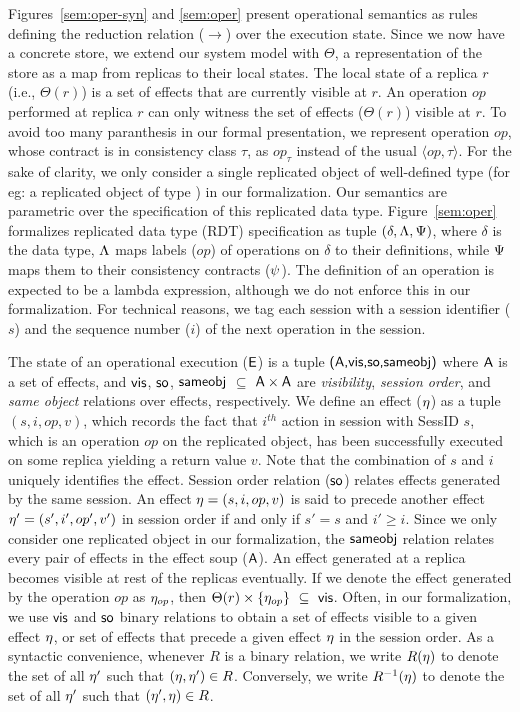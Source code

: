 Figures~\ref{sem:oper-syn} and \ref{sem:oper} present operational semantics as
rules defining the reduction relation ($\xrightarrow{}$) over the execution
state.  Since we now have a concrete store, we extend our system model with
$\Theta$, a representation of the store as a map from replicas to their local
states. The local state of a replica $r$ (i.e., $\Theta(r)$) is a set of
effects that are currently visible at $r$. An operation $op$ performed at
replica $r$ can only witness the set of effects ($\Theta(r)$) visible at $r$.
To avoid too many paranthesis in our formal presentation, we represent
operation $op$, whose contract is in consistency class $\tau$, as $op_\tau$
instead of the usual $\langle op,\tau \rangle$. For the sake of clarity, we
only consider a single replicated object of well-defined type (for eg: a
replicated object of type ) in our formalization.  Our
semantics are parametric over the specification of this replicated data type.
Figure~\ref{sem:oper} formalizes replicated data type (RDT) specification as
tuple $(\delta,\Lambda,\Psi)$, where $\delta$ is the data type, $\Lambda$ maps
labels ($op$) of operations on $\delta$ to their definitions, while $\Psi$
maps them to their consistency contracts ($\psi$). The definition of an
operation is expected to be a lambda expression, although we do not enforce
this in our formalization. For technical reasons, we tag each session with a
session identifier ($s$) and the sequence number ($i$) of the next operation in
the session.

The state of an operational execution (${\normalfont \textsf{E}}$) is a tuple ${\normalfont \textsf{({\normalfont \textsf{A}},\allowbreak {\normalfont \textsf{vis}},\allowbreak {\normalfont \textsf{so}},\allowbreak {\normalfont \textsf{sameobj}})}}$ where
${\normalfont \textsf{A}}$ is a set of effects, and ${\normalfont \textsf{vis}}$, ${\normalfont \textsf{so}}$, ${\normalfont \textsf{sameobj}}$ $\subseteq$
${\normalfont \textsf{A}} \times {\normalfont \textsf{A}}$ are \emph{visibility}, \emph{session order}, and
\emph{same object} relations over effects, respectively. We define an effect
($\eta$) as a tuple $(s,i,op,v)$, which records the fact that $i^{th}$ action
in session with {\sf SessID} $s$, which is an operation $op$ on the replicated
object, has been successfully executed on some replica yielding a return value
$v$. Note that the combination of $s$ and $i$ uniquely identifies the effect.
Session order relation (${\normalfont \textsf{so}}$) relates effects generated by the same session.
An effect $\eta = (s,i,op,v)$ is said to precede another effect $\eta' =
(s',i',op',v')$ in session order if and only if $s'=s$ and $i'\ge i$. Since we
only consider one replicated object in our formalization, the ${\normalfont \textsf{sameobj}}$
relation relates every pair of effects in the effect soup (${\normalfont \textsf{A}}$). An
effect generated at a replica becomes visible at rest of the replicas
eventually.  If we denote the effect generated by the operation $op$ as
$\eta_{op}$, then $\Theta(r) \times \{\eta_{op}\} ~\subseteq~ {\normalfont \textsf{vis}}$. Often, in
our formalization, we use ${\normalfont \textsf{vis}}$ and ${\normalfont \textsf{so}}$ binary relations to obtain a set
of effects visible to a given effect $\eta$, or set of effects that precede a
given effect $\eta$ in the session order. As a syntactic convenience, whenever
$R$ is a binary relation, we write $R(\eta)$ to denote the set of all $\eta'$
such that $(\eta,\eta') \in R$.  Conversely, we write $R^{-1}(\eta)$ to denote
the set of all $\eta'$ such that $(\eta',\eta) \in R$.

